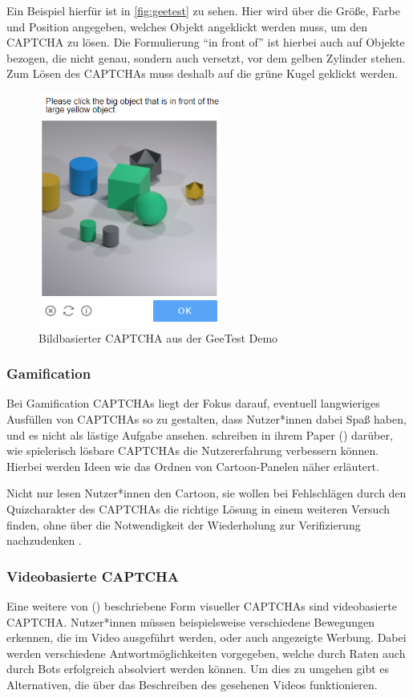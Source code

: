Ein Beispiel hierfür ist in \autoref{fig:geetest} zu sehen.
Hier wird über die Größe, Farbe und Position angegeben, welches Objekt angeklickt werden muss, um den CAPTCHA zu lösen.
Die Formulierung ``in front of'' ist hierbei auch auf Objekte bezogen, die nicht genau, sondern auch versetzt, vor dem gelben Zylinder stehen.
Zum Lösen des CAPTCHAs muss deshalb auf die grüne Kugel geklickt werden.

\begin{figure}[h!]
        \centering
        \includegraphics[width=6cm]{gfx/mygraphics/raeumlich.png} 
    \caption{Bildbasierter CAPTCHA aus der GeeTest Demo}
    \label{fig:geetest}
\end{figure}

\subsubsection*{Gamification}
Bei Gamification CAPTCHAs liegt der Fokus darauf, eventuell langwieriges Ausfüllen von CAPTCHAs so zu gestalten, dass Nutzer*innen dabei Spaß haben,
und es nicht als lästige Aufgabe ansehen.
\citeauthor{gamified} schreiben in ihrem Paper  (\cite{gamified}) darüber, wie spielerisch lösbare CAPTCHAs die Nutzererfahrung verbessern können.
Hierbei werden Ideen wie das Ordnen von Cartoon-Panelen näher erläutert.
\pagebreak

Nicht nur lesen Nutzer*innen den Cartoon, sie wollen bei Fehlschlägen durch den Quizcharakter des CAPTCHAs die richtige Lösung in einem weiteren Versuch finden,
ohne über die Notwendigkeit der Wiederholung zur Verifizierung nachzudenken \cite[p.41ff]{gamified}. 


\subsubsection*{Videobasierte CAPTCHA}
Eine weitere von \citeauthor{surveyofresearch} (\cite[p.79]{surveyofresearch}) beschriebene Form visueller CAPTCHAs sind videobasierte CAPTCHA. 
Nutzer*innen müssen beispielsweise verschiedene Bewegungen erkennen, die im Video ausgeführt werden,
oder auch angezeigte Werbung.
Dabei werden verschiedene Antwortmöglichkeiten vorgegeben, welche durch Raten auch durch Bots erfolgreich absolviert werden können.
Um dies zu umgehen gibt es Alternativen, die über das Beschreiben des gesehenen Videos funktionieren. 

